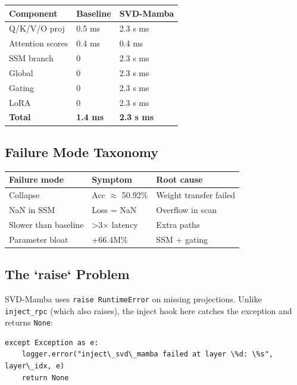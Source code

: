\begin{table}[H]
\centering
\small
\begin{tabular}{lll}
\toprule
\textbf{Component} & \textbf{Baseline} & \textbf{SVD-Mamba} \\
\midrule
Q/K/V/O proj & 0.5 ms & 2.3 s ms \\
Attention scores & 0.4 ms & 0.4 ms \\
SSM branch & 0 & 2.3 s ms \\
Global & 0 & 2.3 s ms \\
Gating & 0 & 2.3 s ms \\
LoRA & 0 & 2.3 s ms \\
\textbf{Total} & \textbf{1.4 ms} & \textbf{2.3 s ms} \\
\bottomrule
\end{tabular}
\end{table}

\subsection{Failure Mode Taxonomy}

\begin{table}[H]
\centering
\small
\begin{tabular}{lll}
\toprule
\textbf{Failure mode} & \textbf{Symptom} & \textbf{Root cause} \\
\midrule
Collapse & Acc $\approx$ 50.92\% & Weight transfer failed \\
NaN in SSM & Loss = NaN & Overflow in scan \\
Slower than baseline & \textgreater{}3$\times$ latency & Extra paths \\
Parameter bloat & +66.4M\% & SSM + gating \\
\bottomrule
\end{tabular}
\end{table}

\subsection{The `raise` Problem}

SVD-Mamba uses \texttt{raise RuntimeError} on missing projections. Unlike 
\texttt{inject\_rpc} (which also raises), the inject hook here catches the 
exception and returns \texttt{None}:

\begin{lstlisting}
except Exception as e:
    logger.error("inject\_svd\_mamba failed at layer \%d: \%s", layer\_idx, e)
    return None
\end{lstlisting}

